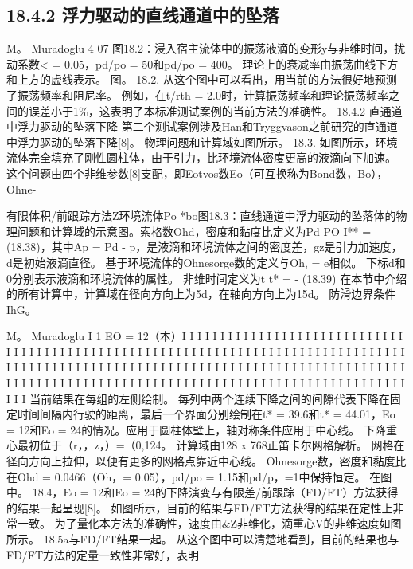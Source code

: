 \documentclass[UTF8,11pt,a4paper,openany,fontset=fandol]{ctexbook}
\begin{document}
\subsection{18.4.2 浮力驱动的直线通道中的坠落}
M。 Muradoglu 4 07 图18.2：浸入宿主流体中的振荡液滴的变形y与非维时间，扰动系数< = 0.05，pd/po = 50和pd/po = 400。 理论上的衰减率由振荡曲线下方和上方的虚线表示。 图。 18.2. 从这个图中可以看出，用当前的方法很好地预测了振荡频率和阻尼率。 例如，在t/rth = 2.0时，计算振荡频率和理论振荡频率之间的误差小于1\%，这表明了本标准测试案例的当前方法的准确性。 18.4.2 直通道中浮力驱动的坠落下降 第二个测试案例涉及Han和Tryggvason之前研究的直通道中浮力驱动的坠落下降[8]。 物理问题和计算域如图所示。 18.3. 如图所示，环境流体完全填充了刚性圆柱体，由于引力，比环境流体密度更高的液滴向下加速。 这个问题由四个非维参数[8]支配，即Eotvos数Eo（可互换称为Bond数，Bo），Ohne-

有限体积/前跟踪方法Z环境流体Po *bo图18.3：直线通道中浮力驱动的坠落体的物理问题和计算域的示意图。索格数Ohd，密度和黏度比定义为Pd PO I** = - (18.38)，其中Ap = Pd - p，是液滴和环境流体之间的密度差，gz是引力加速度，d是初始液滴直径。 基于环境流体的Ohnesorge数的定义与Oh, = e相似。 下标d和0分别表示液滴和环境流体的属性。 非维时间定义为t t* = - (18.39) 在本节中介绍的所有计算中，计算域在径向方向上为5d，在轴向方向上为15d。 防滑边界条件 IhG。

M。 Muradoglu I 1 EO = 12（本）I I I I I I I I I I I I I I I I I I I I I I I I I I I I I I I I I I I I I I I I I I I I I I I I I I I I I I I I I I I I I I I I I I I I I I I I I I I I I I I I I I I I I I I I I I I I I I I I I I I I I I I I I I I I I I I I I I I I I I I I I I I I I I I I I I I I I I I I I I I I I I I I I I I I I I I I I I I I I I I I I I I I I I I I I I I I I I I I I I I I I I I I I I I I 当前结果在每组的左侧绘制。 每列中两个连续下降之间的间隙代表下降在固定时间间隔内行驶的距离，最后一个界面分别绘制在t* = 39.6和t* = 44.01，Eo = 12和Eo = 24的情况。应用于圆柱体壁上，轴对称条件应用于中心线。 下降重心最初位于（r，，z，）=（0,124。 计算域由128 x 768正笛卡尔网格解析。 网格在径向方向上拉伸，以便有更多的网格点靠近中心线。 Ohnesorge数，密度和黏度比在Ohd = 0.0466（Oh，= 0.05），pd/po = 1.15和pd/p，=1中保持恒定。 在图中。 18.4，Eo = 12和Eo = 24的下降演变与有限差/前跟踪（FD/FT）方法获得的结果一起呈现[8]。 如图所示，目前的结果与FD/FT方法获得的结果在定性上非常一致。 为了量化本方法的准确性，速度由\&Z非维化，滴重心V的非维速度如图所示。 18.5a与FD/FT结果一起。 从这个图中可以清楚地看到，目前的结果也与FD/FT方法的定量一致性非常好，表明
\end{document}

